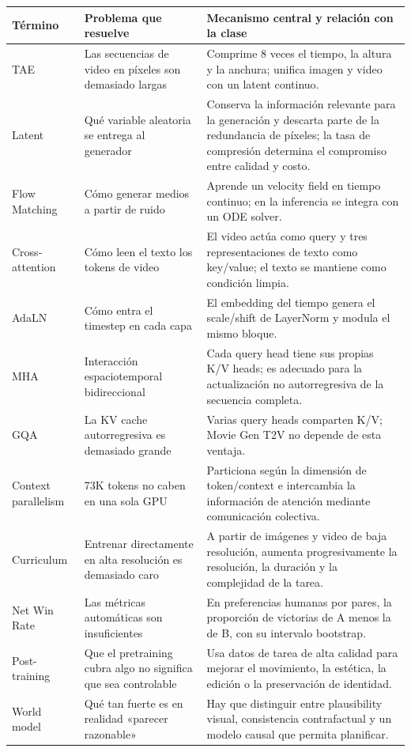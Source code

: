 \documentclass[a4paper]{article}
\begin{document}
\begin{center}
\small
\begin{tabularx}{\textwidth}{p{} X X}
\toprule
\textbf{Término} & \textbf{Problema que resuelve} & \textbf{Mecanismo central y relación con la clase} \\
\midrule
TAE & Las secuencias de video en píxeles son demasiado largas & Comprime 8 veces el tiempo, la altura y la anchura; unifica imagen y video con un latent continuo. \\
Latent & Qué variable aleatoria se entrega al generador & Conserva la información relevante para la generación y descarta parte de la redundancia de píxeles; la tasa de compresión determina el compromiso entre calidad y costo. \\
Flow Matching & Cómo generar medios a partir de ruido & Aprende un velocity field en tiempo continuo; en la inferencia se integra con un ODE solver. \\
Cross-attention & Cómo leen el texto los tokens de video & El video actúa como query y tres representaciones de texto como key/value; el texto se mantiene como condición limpia. \\
AdaLN & Cómo entra el timestep en cada capa & El embedding del tiempo genera el scale/shift de LayerNorm y modula el mismo bloque. \\
MHA & Interacción espaciotemporal bidireccional & Cada query head tiene sus propias K/V heads; es adecuado para la actualización no autorregresiva de la secuencia completa. \\
GQA & La KV cache autorregresiva es demasiado grande & Varias query heads comparten K/V; Movie Gen T2V no depende de esta ventaja. \\
Context parallelism & 73K tokens no caben en una sola GPU & Particiona según la dimensión de token/context e intercambia la información de atención mediante comunicación colectiva. \\
Curriculum & Entrenar directamente en alta resolución es demasiado caro & A partir de imágenes y video de baja resolución, aumenta progresivamente la resolución, la duración y la complejidad de la tarea. \\
Net Win Rate & Las métricas automáticas son insuficientes & En preferencias humanas por pares, la proporción de victorias de A menos la de B, con su intervalo bootstrap. \\
Post-training & Que el pretraining cubra algo no significa que sea controlable & Usa datos de tarea de alta calidad para mejorar el movimiento, la estética, la edición o la preservación de identidad. \\
World model & Qué tan fuerte es en realidad «parecer razonable» & Hay que distinguir entre plausibility visual, consistencia contrafactual y un modelo causal que permita planificar. \\
\bottomrule
\end{tabularx}
\end{center}
\end{document}
